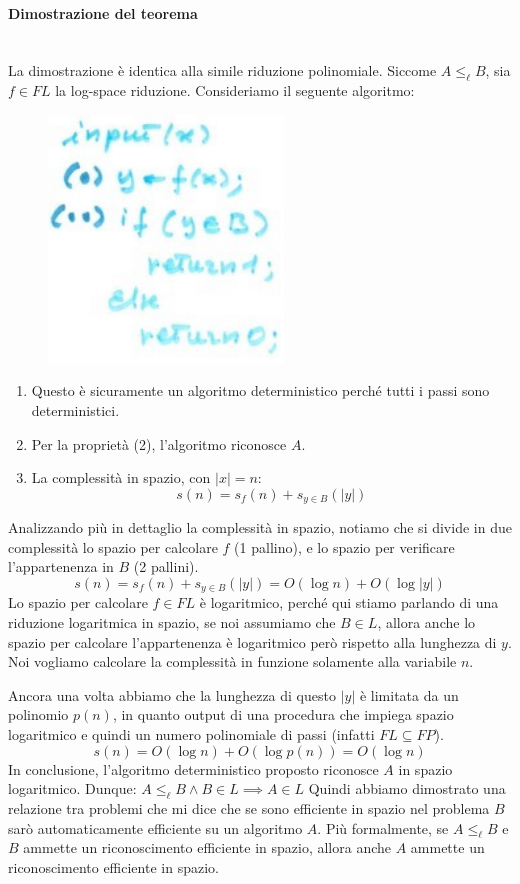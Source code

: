 \documentclass{article}
\begin{document}
\paragraph{Dimostrazione del teorema}\mbox{}\\
La dimostrazione è identica alla simile riduzione polinomiale. Siccome $A\leq_{\ell}B$, sia
$f\in FL$ la log-space riduzione. Consideriamo il seguente algoritmo:
\begin{figure}[H]
    \centering
    \includegraphics[scale=0.6]{images/algo_det_daf.png}
\end{figure}
\begin{enumerate}
    \item Questo è sicuramente un algoritmo deterministico perché tutti i passi
          sono deterministici.
    \item Per la proprietà (2), l'algoritmo riconosce $A$.
    \item La complessità in spazio, con $|x|=n$:
          $$s(n)=s_f(n)+s_{y\in B}(|y|)$$
\end{enumerate}
Analizzando più in dettaglio la complessità in spazio, notiamo che si divide in due
complessità lo spazio per calcolare $f$ (1 pallino), e lo spazio per verificare
l'appartenenza in $B$ (2 pallini).
$$s(n)=s_f(n)+s_{y\in B}(|y|)=O(\log n)+O(\log |y|)$$
Lo spazio per calcolare $f\in FL$ è logaritmico, perché qui stiamo parlando di una riduzione logaritmica
in spazio, se noi assumiamo che $B\in L$, allora anche lo spazio per calcolare l'appartenenza
è logaritmico però rispetto alla lunghezza di $y$. Noi vogliamo calcolare la complessità
in funzione solamente alla variabile $n$.

Ancora una volta abbiamo che la lunghezza di questo $|y|$ è limitata da un polinomio $p(n)$, in
quanto output di una procedura che impiega spazio logaritmico e quindi un numero polinomiale di
passi (infatti $FL\subseteq FP$).
$$s(n)=O(\log n)+O(\log p(n))=O(\log n)$$
In conclusione, l'algoritmo deterministico proposto riconosce $A$ in spazio logaritmico.
Dunque: $A\leq_{\ell}B\land B\in L\implies A\in L$
Quindi abbiamo dimostrato una relazione tra problemi che mi dice che se sono efficiente in spazio
nel problema $B$ sarò automaticamente efficiente su un algoritmo $A$. Più formalmente, se
$A\leq_{\ell}B$ e $B$ ammette un riconoscimento efficiente in spazio, allora anche $A$ ammette un
riconoscimento efficiente in spazio.
\end{document}
